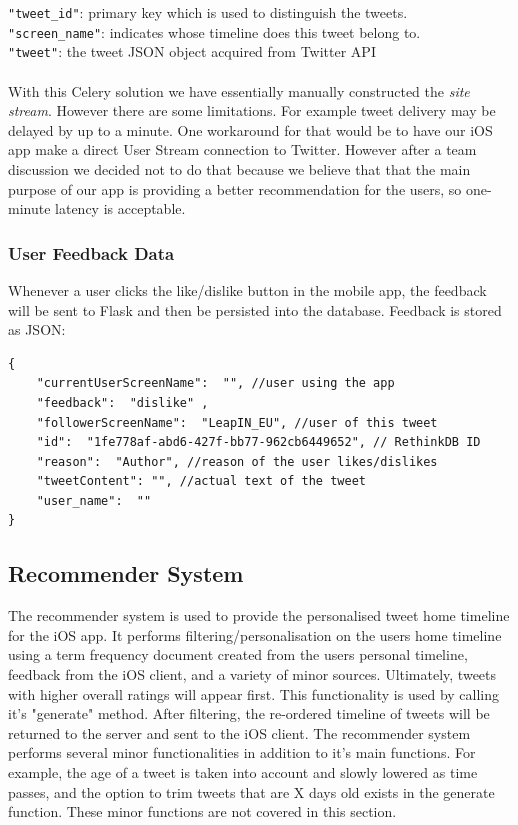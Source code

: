\documentclass{article}
\begin{document}
\noindent \texttt{"tweet\_id"}: primary key which is used to distinguish the tweets. \\
\texttt{"screen\_name"}: indicates whose timeline does this tweet belong to. \\
\texttt{"tweet"}: the tweet JSON object acquired from Twitter API
\\\\
With this Celery solution we have essentially manually constructed the \textit{site stream}. However there are some limitations. For example tweet delivery may be delayed by up to a minute. One workaround for that would be to have our iOS app make a direct User Stream connection to Twitter. However after a team discussion we decided not to do that because we believe that that the main purpose of our app is providing a better recommendation for the users, so one-minute latency is acceptable.

\subsubsection*{User Feedback Data} 
Whenever a user clicks the like/dislike button in the mobile app, the feedback will be sent to Flask and then be persisted into the database. Feedback is stored as JSON:

\begin{samepage}
\begin{verbatim}
{
    "currentUserScreenName":  "", //user using the app
    "feedback":  "dislike" ,
    "followerScreenName":  "LeapIN_EU", //user of this tweet
    "id":  "1fe778af-abd6-427f-bb77-962cb6449652", // RethinkDB ID
    "reason":  "Author", //reason of the user likes/dislikes
    "tweetContent": "", //actual text of the tweet
    "user_name":  ""
}
\end{verbatim}
\end{samepage}



\subsection{Recommender System} 
The recommender system is used to provide the personalised tweet home timeline for the iOS app. It performs filtering/personalisation on the users home timeline using a term frequency document created from the users personal timeline, feedback from the iOS client, and a variety of minor sources. Ultimately, tweets with higher overall ratings will appear first. This functionality is used by calling it's "generate" method. After filtering, the re-ordered timeline of tweets will be returned to the server and sent to the iOS client. The recommender system performs several minor functionalities in addition to it's main functions. For example, the age of a tweet is taken into account and slowly lowered as time passes, and the option to trim tweets that are X days old exists in the generate function. These minor functions are not covered in this section.
\end{document}
